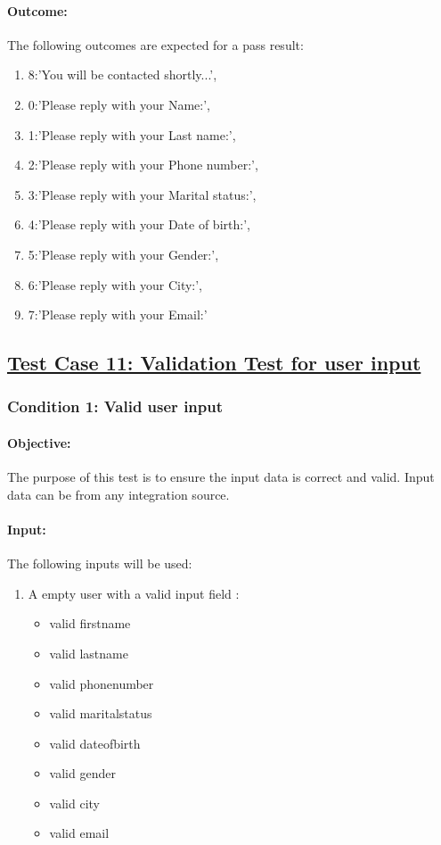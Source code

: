 \documentclass{article}
\begin{document}
\paragraph{Outcome:} The following outcomes are expected for a pass result:
\begin{enumerate}
	 \item 8:'You will be contacted shortly...',
     \item 0:'Please reply with your Name:',
     \item 1:'Please reply with your Last name:',
     \item 2:'Please reply with your Phone number:',
     \item 3:'Please reply with your Marital status:',
     \item 4:'Please reply with your Date of birth:',
     \item 5:'Please reply with your Gender:',
     \item 6:'Please reply with your City:',
     \item 7:'Please reply with your Email:'
\end{enumerate}






\subsection{\underline{Test Case 11: Validation Test for user input}}\label{test11}
\subsubsection{Condition 1: Valid user input}
\paragraph{Objective:} The purpose of this test is to ensure the input data is correct and valid. Input data can be from any integration source.
\paragraph{Input:} The following inputs will be used:
\begin{enumerate}
	\item A empty user with a valid input field :
	\begin{itemize}
  	\item valid firstname
    \item valid lastname
    \item valid phonenumber
    \item valid maritalstatus
    \item valid dateofbirth
    \item valid gender
    \item valid city 
    \item valid email
    \end{itemize}	  
\end{enumerate}
\end{document}
